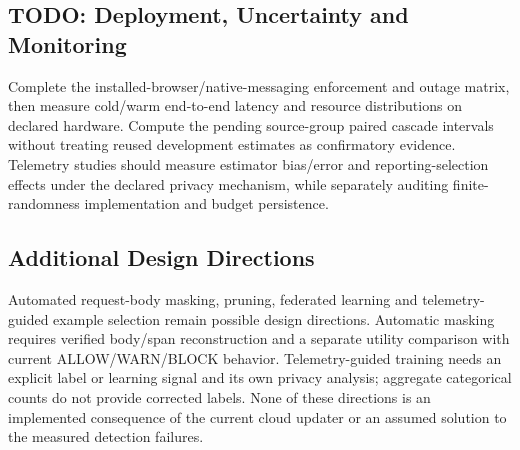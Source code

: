 \documentclass[conference]{IEEEtran}
\begin{document}
\subsection{TODO: Deployment, Uncertainty and Monitoring}

Complete the installed-browser/native-messaging enforcement and outage matrix, then measure cold/warm end-to-end latency and resource distributions on declared hardware. Compute the pending source-group paired cascade intervals without treating reused development estimates as confirmatory evidence. Telemetry studies should measure estimator bias/error and reporting-selection effects under the declared privacy mechanism, while separately auditing finite-randomness implementation and budget persistence.

\subsection{Additional Design Directions}

Automated request-body masking, pruning, federated learning and telemetry-guided example selection remain possible design directions. Automatic masking requires verified body/span reconstruction and a separate utility comparison with current ALLOW/WARN/BLOCK behavior. Telemetry-guided training needs an explicit label or learning signal and its own privacy analysis; aggregate categorical counts do not provide corrected labels. None of these directions is an implemented consequence of the current cloud updater or an assumed solution to the measured detection failures.



\end{document}
